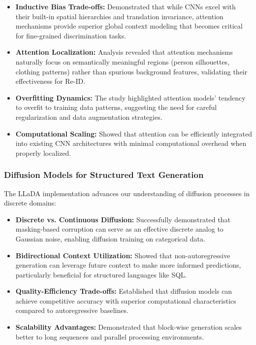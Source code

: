 \documentclass[a4paper,12pt]{article}
\begin{document}
\begin{itemize}
    \item \textbf{Inductive Bias Trade-offs:} Demonstrated that while CNNs excel with their built-in spatial hierarchies and translation invariance, attention mechanisms provide superior global context modeling that becomes critical for fine-grained discrimination tasks.
    \item \textbf{Attention Localization:} Analysis revealed that attention mechanisms naturally focus on semantically meaningful regions (person silhouettes, clothing patterns) rather than spurious background features, validating their effectiveness for Re-ID.
    \item \textbf{Overfitting Dynamics:} The study highlighted attention models' tendency to overfit to training data patterns, suggesting the need for careful regularization and data augmentation strategies.
    \item \textbf{Computational Scaling:} Showed that attention can be efficiently integrated into existing CNN architectures with minimal computational overhead when properly localized.
\end{itemize}

\subsubsection*{Diffusion Models for Structured Text Generation}
The LLaDA implementation advances our understanding of diffusion processes in discrete domains:

\begin{itemize}
    \item \textbf{Discrete vs. Continuous Diffusion:} Successfully demonstrated that masking-based corruption can serve as an effective discrete analog to Gaussian noise, enabling diffusion training on categorical data.
    \item \textbf{Bidirectional Context Utilization:} Showed that non-autoregressive generation can leverage future context to make more informed predictions, particularly beneficial for structured languages like SQL.
    \item \textbf{Quality-Efficiency Trade-offs:} Established that diffusion models can achieve competitive accuracy with superior computational characteristics compared to autoregressive baselines.
    \item \textbf{Scalability Advantages:} Demonstrated that block-wise generation scales better to long sequences and parallel processing environments.
\end{itemize}
\end{document}
